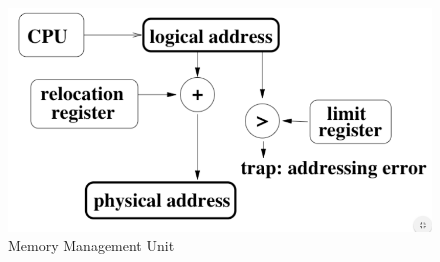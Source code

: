 \documentclass{article}
\begin{document}
\vspace{0.4cm}

\begin{figure}[h]
	\centering
	\includegraphics[scale=0.4]{img/mmu.png}
	\caption{Memory Management Unit}
\end{figure}

\newpage
\nocite{*}


\end{document}
